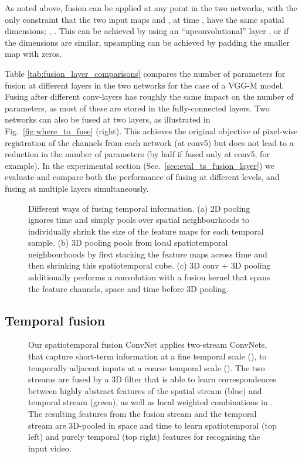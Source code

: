 \documentclass[10pt,twocolumn,letterpaper]{article}
\begin{document}
As noted above, fusion can be applied at any point in the two
networks, with the only constraint that the two input maps  and , 
at time , have the same spatial dimensions; \ie , .
This can be achieved by using an ``upconvolutional'' layer \cite{Zeiler13}, or if the dimensions are similar, upsampling can be achieved by padding the smaller map with zeros. 

Table \ref{tab:fusion_layer_comparisons} compares the number of
parameters for fusion at different layers in the two networks for the
case of a VGG-M model. Fusing after different conv-layers has
roughly the same impact on the number of parameters, as most of these
are stored in the fully-connected layers. 
Two networks can also be fused at two layers, as illustrated 
in Fig.~\ref{fig:where_to_fuse} (right). This achieves the original 
objective of pixel-wise registration of the channels from each network
(at conv5) but does not lead to a reduction in the number of parameters
(by half if fused only at conv5, for example).
In the experimental section (Sec.~\ref{sec:eval_ts_fusion_layer}) we evaluate and compare
both the performance of fusing at different levels, and fusing at
multiple layers simultaneously. 

\begin{figure}[!h]
	\centering
	\caption{ Different ways of fusing temporal information. (a) 2D pooling ignores time and simply pools over spatial neighbourhoods to individually shrink the size of the feature maps  for each temporal sample. (b) 3D pooling pools from local spatiotemporal neighbourhoods by first stacking the feature maps across time and then shrinking this spatiotemporal cube. (c) 3D conv + 3D pooling additionally performs a convolution with a fusion kernel that spans the feature channels, space and time before 3D pooling.
	}
	\label{fig:temporal_fusion}
	\vspace{-15pt}
\end{figure}
\subsection{Temporal fusion} \label{sec:temporalFusion}



\begin{figure*}[!t]
	\centering
	\caption{Our spatiotemporal fusion ConvNet applies two-stream ConvNets, that capture short-term information at a fine temporal scale (), to temporally adjacent inputs at a coarse temporal scale (). The two streams are fused by a 3D filter that is able to learn correspondences between highly abstract features of the spatial stream (blue) and temporal stream (green), as well as local weighted combinations in . The resulting features from the fusion stream and the temporal stream are 3D-pooled in space and time to learn spatiotemporal (top left) and purely temporal (top right) features for recognising the input video.
	}
	\label{fig:architecture}
	\vspace{-10pt}
\end{figure*}
\end{document}
